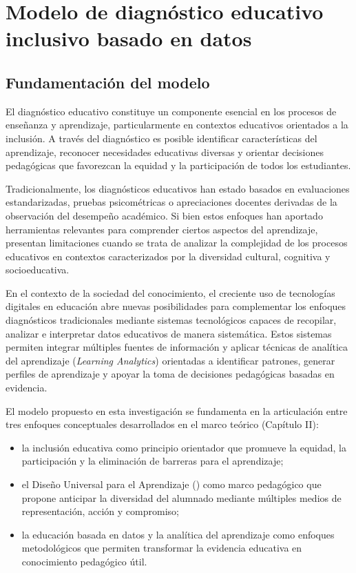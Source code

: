 \chapter{Modelo de diagnóstico educativo inclusivo basado en datos}

\begin{refsection}


\section{Fundamentación del modelo}

El diagnóstico educativo constituye un componente esencial en los procesos de enseñanza y aprendizaje, particularmente en contextos educativos orientados a la inclusión. A través del diagnóstico es posible identificar características del aprendizaje, reconocer necesidades educativas diversas y orientar decisiones pedagógicas que favorezcan la equidad y la participación de todos los estudiantes.

Tradicionalmente, los diagnósticos educativos han estado basados en evaluaciones estandarizadas, pruebas psicométricas o apreciaciones docentes derivadas de la observación del desempeño académico. Si bien estos enfoques han aportado herramientas relevantes para comprender ciertos aspectos del aprendizaje, presentan limitaciones cuando se trata de analizar la complejidad de los procesos educativos en contextos caracterizados por la diversidad cultural, cognitiva y socioeducativa.

En el contexto de la sociedad del conocimiento, el creciente uso de tecnologías digitales en educación abre nuevas posibilidades para complementar los enfoques diagnósticos tradicionales mediante sistemas tecnológicos capaces de recopilar, analizar e interpretar datos educativos de manera sistemática. Estos sistemas permiten integrar múltiples fuentes de información y aplicar técnicas de analítica del aprendizaje (\textit{Learning Analytics}) orientadas a identificar patrones, generar perfiles de aprendizaje y apoyar la toma de decisiones pedagógicas basadas en evidencia.

El modelo propuesto en esta investigación se fundamenta en la articulación entre tres enfoques conceptuales desarrollados en el marco teórico (Capítulo II):

\begin{itemize}
\item la inclusión educativa como principio orientador que promueve la equidad, la participación y la eliminación de barreras para el aprendizaje;
\item el Diseño Universal para el Aprendizaje (\DUA) como marco pedagógico que propone anticipar la diversidad del alumnado mediante múltiples medios de representación, acción y compromiso;
\item la educación basada en datos y la analítica del aprendizaje como enfoques metodológicos que permiten transformar la evidencia educativa en conocimiento pedagógico útil.
\end{itemize}


\end{refsection}
